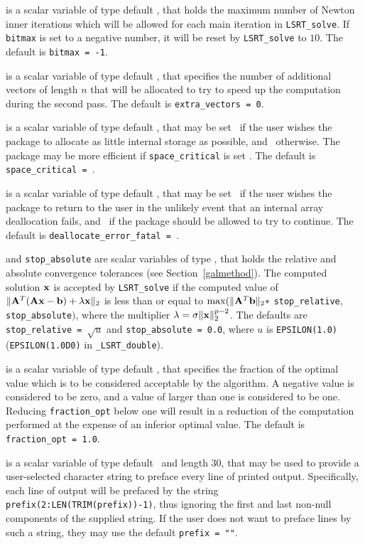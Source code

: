 \documentclass{galahad}
\newcommand{\packagename}{LS\-RT}
\newcommand{\fullpackagename}{\libraryname\_\packagename}
\begin{document}
\begin{description}
 is a scalar variable of type default \integer, that holds the 
maximum number of Newton inner iterations which will be allowed for each
main iteration in {\tt \packagename\_solve}. 
If {\tt bitmax} is set to a negative number, it will be reset by  
{\tt \packagename\_solve} to $10$. 
The default is {\tt bitmax = -1}.
 
 is a scalar variable of type default \integer, 
that specifies the number of additional vectors of length $n$
that will be allocated to try to speed up the computation during the
second pass.
The default is {\tt extra\_vectors = 0}.
 
 is a scalar variable of type default \logical, that
may be set \true\ if the user wishes the package to allocate as little
internal storage as possible, and \false\ otherwise. The package may
be more efficient if {\tt space\_critical} is set \false.
The default is {\tt space\_critical = \false}.

 is a scalar variable of type default \logical, 
that may be set \true\ if the user wishes the package to return to the user 
in the unlikely event that an internal array deallocation fails, 
and \false\ if the package should be allowed to try to continue.
The default is {\tt deallocate\_error\_fatal = \false}.

 and {\tt stop\_absolute} are scalar variables of type 
\realdp, that holds the 
relative and absolute convergence tolerances (see Section~\ref{galmethod}).  
The computed solution ${\mathbf{x}}$ is accepted by {\tt \packagename\_solve} 
if the computed value of  
$\|{\mathbf{A}}^T ( {\mathbf{A}} {\mathbf{x}} - {\mathbf{b}} ) + \lambda {\mathbf{x}}\|_2$
is less than or equal 
to $\max (\| {\mathbf{A}}^T {\mathbf{b}} \|_2 \ast$ {\tt stop\_relative}, 
{\tt stop\_absolute}$)$, where the multiplier 
$\lambda = \sigma \|{\mathbf{x}}\|_2^{p-2}$.
The defaults are {\tt stop\_relative = $\sqrt{u}$} and
{\tt stop\_absolute = 0.0}, 
where $u$ is {\tt EPSILON(1.0)} ({\tt EPSILON(1.0D0)} in 
{\tt \fullpackagename\_double}).

 is a scalar variable of type default 
\realdp, that specifies the fraction 
of the optimal value which is to be considered acceptable by the algorithm. 
A negative value is considered to be zero, and a value of larger than one 
is considered to be one. Reducing {\tt fraction\_opt} below one will result 
in a reduction of the computation performed at the expense of an inferior 
optimal value. 
The default is {\tt fraction\_opt = 1.0}.

 is a scalar variable of type default \character\
and length 30, that may be used to provide a user-selected 
character string to preface every line of printed output. 
Specifically, each line of output will be prefaced by the string 
{\tt prefix(2:LEN(TRIM(prefix))-1)},
thus ignoring the first and last non-null components of the
supplied string. If the user does not want to preface lines by such
a string, they may use the default {\tt prefix = ""}.

\end{description}
\end{document}
